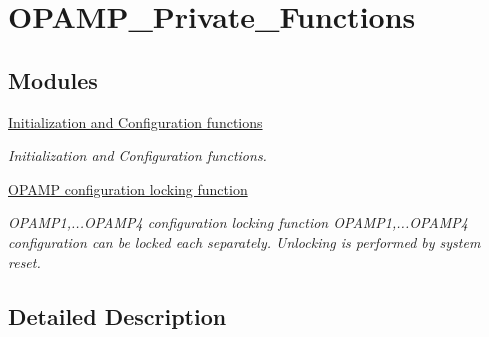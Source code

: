 \hypertarget{group___o_p_a_m_p___private___functions}{\section{O\-P\-A\-M\-P\-\_\-\-Private\-\_\-\-Functions}
\label{group___o_p_a_m_p___private___functions}
}
\subsection*{Modules}
\begin{DoxyCompactItemize}
\item 
\hyperlink{group___o_p_a_m_p___group1}{Initialization and Configuration functions}
\begin{DoxyCompactList}\small\item\em Initialization and Configuration functions. \end{DoxyCompactList}\item 
\hyperlink{group___o_p_a_m_p___group2}{O\-P\-A\-M\-P configuration locking function}
\begin{DoxyCompactList}\small\item\em O\-P\-A\-M\-P1,...O\-P\-A\-M\-P4 configuration locking function O\-P\-A\-M\-P1,...O\-P\-A\-M\-P4 configuration can be locked each separately. Unlocking is performed by system reset. \end{DoxyCompactList}\end{DoxyCompactItemize}


\subsection{Detailed Description}
